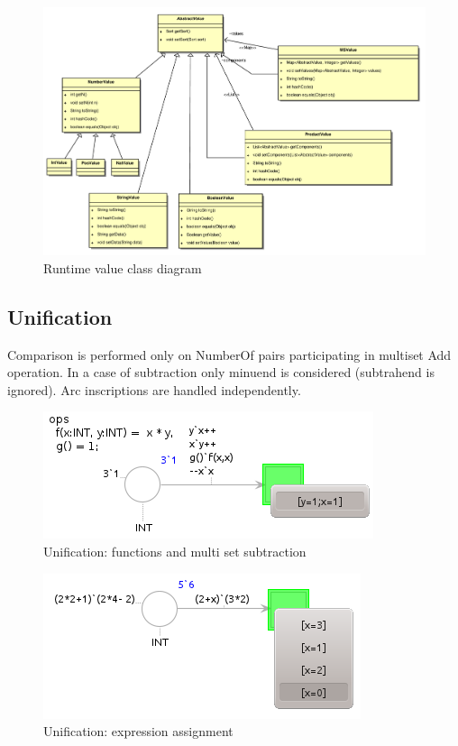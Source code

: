 \begin{figure}[!htb]
  \includegraphics[scale=0.5]{img/runtime.pdf}
  \caption{Runtime value class diagram}\label{fig:rt-value}
\end{figure}

\subsection{Unification}\label{subs:unification}

Comparison is performed only on NumberOf pairs participating in multiset Add operation. In a case of subtraction only minuend is considered (subtrahend is ignored). Arc inscriptions are handled independently.

\begin{figure}[!htb]
  \includegraphics{img/unification-functions-subtract.png}
  \caption{Unification: functions and multi set subtraction}\label{fig:unification-functions-subtract}
\end{figure}

\begin{figure}[!htb]
  \includegraphics{img/unification-arithmetic.png}
  \caption{Unification: expression assignment}\label{fig:unification-arithmetic}
\end{figure}

